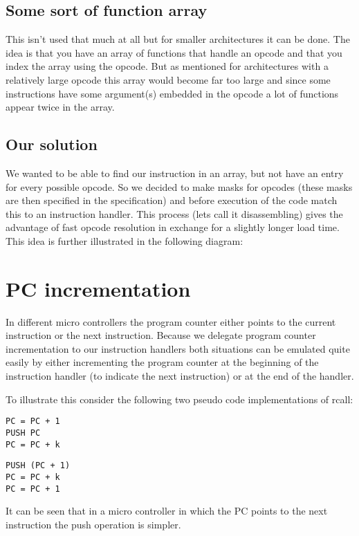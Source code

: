 \subsection{Some sort of function array}
This isn't used that much at all but for smaller architectures it can be
done. The idea is that you have an array of functions that handle an
opcode and that you index the array using the opcode. But as mentioned
for architectures with a relatively large opcode this array would
become far too large and since some instructions have some argument(s)
embedded in the opcode a lot of functions appear twice in the array.

\subsection{Our solution}
We wanted to be able to find our instruction in an array, but not have
an entry for every possible opcode. So we decided to make masks for
opcodes (these masks are then specified in the specification) and
before execution of the code match this to an instruction handler. This
process (lets call it disassembling) gives the advantage of fast opcode
resolution in exchange for a slightly longer load time. This idea is
further illustrated in the following diagram:

\section[PC incrementation]{PC incrementation}
In different micro controllers the program counter either points to the
current instruction or the next instruction. Because we delegate
program counter incrementation to our instruction handlers both
situations can be emulated quite easily by either incrementing the
program counter at the beginning of the instruction handler (to
indicate the next instruction) or at the end of the handler.

To illustrate this consider the following two pseudo code
implementations of rcall:

\lstset{caption=PC points to next instruction}
\begin{lstlisting}
PC = PC + 1
PUSH PC
PC = PC + k
\end{lstlisting}

\lstset{caption=PC points to current instruction}
\begin{lstlisting}
PUSH (PC + 1)
PC = PC + k
PC = PC + 1
\end{lstlisting}

It can be seen that in a micro controller in which the PC points to the
next instruction the push operation is simpler.


